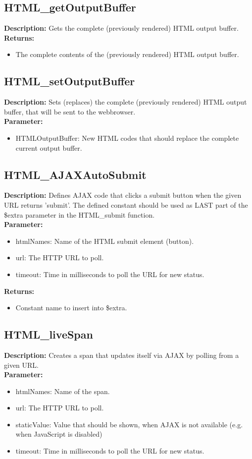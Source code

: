 \subsection{HTML\_getOutputBuffer}
\textbf{Description:} Gets the complete (previously rendered) HTML output buffer.\\
\textbf{Returns:}
\begin{itemize}
\item The complete contents of the (previously rendered) HTML output buffer.
\end{itemize}

\subsection{HTML\_setOutputBuffer}
\textbf{Description:} Sets (replaces) the complete (previously rendered) HTML output buffer, that will be sent to the webbrowser.\\
\textbf{Parameter:}
\begin{itemize}
\item HTMLOutputBuffer: New HTML codes that should replace the complete current output buffer.
\end{itemize}

\subsection{HTML\_AJAXAutoSubmit}
\textbf{Description:} Defines AJAX code that clicks a submit button when the given URL returns 'submit'. The defined constant should be used as LAST part of the \$extra parameter in the HTML\_submit function.\\
\textbf{Parameter:}
\begin{itemize}
\item htmlNames: Name of the HTML submit element (button).
\item url: The HTTP URL to poll.
\item timeout: Time in milliseconds to poll the URL for new status.
\end{itemize}
\textbf{Returns:}
\begin{itemize}
\item Constant name to insert into \$extra.
\end{itemize}

\subsection{HTML\_liveSpan}
\textbf{Description:} Creates a span that updates itself via AJAX by polling from a given URL.\\
\textbf{Parameter:}
\begin{itemize}
\item htmlNames: Name of the span.
\item url: The HTTP URL to poll.
\item staticValue: Value that should be shown, when AJAX is not available (e.g. when JavaScript is disabled)
\item timeout: Time in milliseconds to poll the URL for new status.
\end{itemize}

